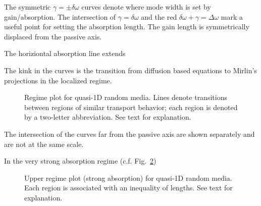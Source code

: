 The symmetric $\gamma = \pm \delta \omega$ curves denote where mode width is set by gain/absorption. The intersection of $\gamma = \delta \omega$ and the red $\delta \omega +\gamma=\Delta \omega$ mark a useful point for setting the absorption length. The gain length is symmetrically displaced from the passive axis. 

The horiziontal absorption line extends 

The kink in the curves is the transition from diffusion based equations to Mirlin's projections in the localized regime.

\begin{figure}
\vskip -0.5cm
\centerline{
}
\vskip -0.5cm
\caption{Regime plot for quasi-1D random media. Lines denote transitions between regions of similar transport behavior; each region is denoted by a two-letter abbreviation. See text for explanation.}
\label{fig:regime_plot_main}
\end{figure}

The intersection of the curves far from the passive axis are shown separately and are not at the same scale. 

In the very strong absorption regime (c.f. Fig.~\ref{fig:regime_plot_upper})

\begin{figure}
\vskip -0.5cm
\centerline{
}
\vskip -0.5cm
\caption{Upper regime plot (strong absorption) for quasi-1D random media. Each region is associated with an inequality of lengths. See text for explanation.}
\label{fig:regime_plot_upper}
\end{figure}


